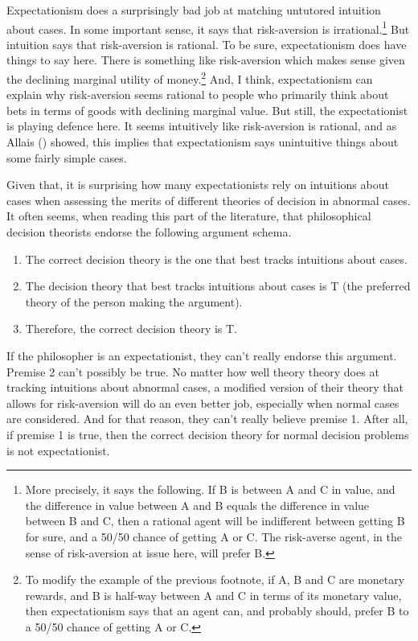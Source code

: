 \documentclass[
  12pt,
  letterpaper,
  DIV=11,
  numbers=noendperiod]{scrreprt}
\providecommand{\tightlist}{%
  \setlength{\itemsep}{0pt}\setlength{\parskip}{0pt}}\usepackage{longtable,booktabs,array}
\begin{document}
Expectationism does a surprisingly bad job at matching untutored
intuition about cases. In some important sense, it says that
risk-aversion is irrational.\footnote{More precisely, it says the
  following. If B is between A and C in value, and the difference in
  value between A and B equals the difference in value between B and C,
  then a rational agent will be indifferent between getting B for sure,
  and a 50/50 chance of getting A or C. The risk-averse agent, in the
  sense of risk-aversion at issue here, will prefer B.} But intuition
says that risk-aversion is rational. To be sure, expectationism does
have things to say here. There is something like risk-aversion which
makes sense given the declining marginal utility of money.\footnote{To
  modify the example of the previous footnote, if A, B and C are
  monetary rewards, and B is half-way between A and C in terms of its
  monetary value, then expectationism says that an agent can, and
  probably should, prefer B to a 50/50 chance of getting A or C.} And, I
think, expectationism can explain why risk-aversion seems rational to
people who primarily think about bets in terms of goods with declining
marginal value. But still, the expectationist is playing defence here.
It seems intuitively like risk-aversion is rational, and as Allais
() showed, this implies that
expectationism says unintuitive things about some fairly simple cases.

Given that, it is surprising how many expectationists rely on intuitions
about cases when assessing the merits of different theories of decision
in abnormal cases. It often seems, when reading this part of the
literature, that philosophical decision theorists endorse the following
argument schema.

\begin{enumerate}
\def\labelenumi{\arabic{enumi}.}
\tightlist
\item
  The correct decision theory is the one that best tracks intuitions
  about cases.
\item
  The decision theory that best tracks intuitions about cases is T (the
  preferred theory of the person making the argument).
\item
  Therefore, the correct decision theory is T.
\end{enumerate}

If the philosopher is an expectationist, they can't really endorse this
argument. Premise 2 can't possibly be true. No matter how well theory
theory does at tracking intuitions about abnormal cases, a modified
version of their theory that allows for risk-aversion will do an even
better job, especially when normal cases are considered. And for that
reason, they can't really believe premise 1. After all, if premise 1 is
true, then the correct decision theory for normal decision problems is
not expectationist.
\end{document}
